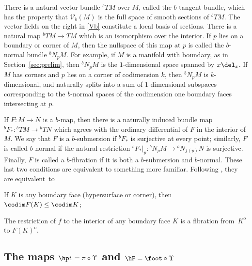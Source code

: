 There is a natural vector-bundle ${}^b TM$ over $M$, called the $b$-tangent bundle, which has the property that
$\mathcal V_b(M)$ is the full space of smooth sections of ${}^b TM$. The vector fields on the right in \eqref{Vb} constitute a local basis of sections. There is a natural map ${}^b TM \to TM$ which is an isomorphism over the interior. If $p$ lies on a boundary or corner of $M$, then the nullspace of this map at $p$ is called the $b$-normal bundle ${}^b N_p M$. For example, if $M$ is a manifold with boundary, as in Section~\ref{sec:prelim}, then ${}^bN_p M$ is the $1$-dimensional space spanned by $x\del_x$. If $M$ has corners and $p$ lies on a corner of codimension $k$, then ${}^bN_p M$ is $k$-dimensional, and naturally splits into a sum of $1$\nobreakdash-dimensional subspaces corresponding to the $b$-normal spaces of the codimension one boundary faces intersecting at $p$.

If $F:M \to N$ is a $b$-map, then there is a naturally induced bundle map ${}^bF_*: {}^bTM \to {}^bTN$ which agrees with the ordinary differential of $F$ in the interior of $M$. We say that $F$ is a $b$-submersion if ${}^b F_*$ is surjective at every point; similarly, $F$ is called $b$-normal if the natural restriction ${}^bF_*|_p: {}^bN_p M \to {}^bN_{f(p)} N$ is surjective. Finally, $F$ is called a $b$-fibration if it is both a $b$-submersion and $b$-normal.
These last two conditions are equivalent to something more familiar. Following \cite[Def.\,3.9]{Grieser2001}, they are
equivalent~to
\begin{enumeratea}
\item
If $K$ is any boundary face (\ie hypersurface or corner), then $\codim  F(K) \le \codim  K$;
\item
The restriction of $f$ to the interior of any boundary face $K$ is a fibration from~$K^o$ to $F(K)^o$.
\end{enumeratea}

\subsection{The maps $\hpi = \pi\circ\Upsilon$ and $\hF = \foot\circ\Upsilon$} \label{ssec:doubleb}

